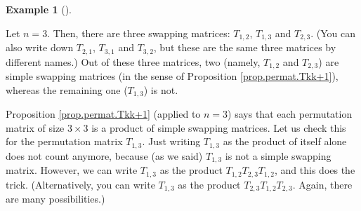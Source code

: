 \documentclass[numbers=enddot,12pt,final,onecolumn,notitlepage]{scrartcl}%
\theoremstyle{definition}
\newtheorem{exam}[theo]{Example}
\newenvironment{example}[1][]
{\begin{exam}[#1]\begin{leftbar}}
{\end{leftbar}\end{exam}}
\begin{document}
\begin{example}
Let $n=3$. Then, there are three swapping matrices: $T_{1,2}$, $T_{1,3}$ and
$T_{2,3}$. (You can also write down $T_{2,1}$, $T_{3,1}$ and $T_{3,2}$, but
these are the same three matrices by different names.) Out of these three
matrices, two (namely, $T_{1,2}$ and $T_{2,3}$) are simple swapping matrices
(in the sense of Proposition \ref{prop.permat.Tkk+1}), whereas the remaining
one ($T_{1,3}$) is not.

Proposition \ref{prop.permat.Tkk+1} (applied to $n=3$) says that each
permutation matrix of size $3\times3$ is a product of simple swapping
matrices. Let us check this for the permutation matrix $T_{1,3}$. Just writing
$T_{1,3}$ as the product of itself alone does not count anymore, because (as
we said) $T_{1,3}$ is not a simple swapping matrix. However, we can write
$T_{1,3}$ as the product $T_{1,2}T_{2,3}T_{1,2}$, and this does the trick.
(Alternatively, you can write $T_{1,3}$ as the product $T_{2,3}T_{1,2}T_{2,3}%
$. Again, there are many possibilities.)
\end{example}
\end{document}
